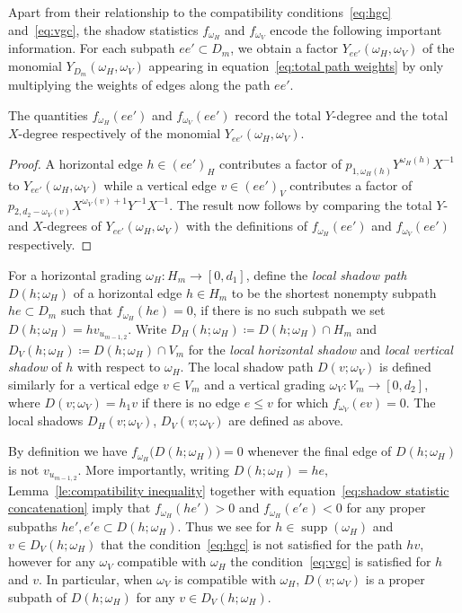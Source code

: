 \documentclass[ALCO,ThmDefs,Unicode,epreuves]{cedram}
\DeclareMathOperator{\supp}{supp}
\begin{document}
Apart from their relationship to the compatibility conditions~\eqref{eq:hgc} and~\eqref{eq:vgc}, the shadow statistics $f_{\omega_H}$ and $f_{\omega_V}$ encode the following important information. 
For each subpath $ee'\subset D_m$, we obtain a factor $Y_{ee'}(\omega_H,\omega_V)$ of the monomial $Y_{D_m}(\omega_H,\omega_V)$ appearing in equation~\eqref{eq:total path weights} by only multiplying the weights of edges along the path $ee'$.
\begin{lemma}
 \label{le:shadows and degrees}
 The quantities $f_{\omega_H}(ee')$ and $f_{\omega_V}(ee')$ record the total $Y$-degree and the total $X$-degree respectively of the monomial $Y_{ee'}(\omega_H,\omega_V)$.
\end{lemma}

\begin{proof}
 A horizontal edge $h \in ( e e ' )_{ H}$ contributes a factor of $p _{ 1 , \omega_{ H}  ( h )}  Y^{ \omega_{ H}  ( h ) }X^{ - 1}$  to $Y_{ e e '} ( \omega_{ H} , \omega_{ V} )$ while a vertical edge $v\in(ee')_V$ contributes a factor of\break $p_{2,d_2-\omega_V(v)}X^{\omega_V(v)+1}Y^{-1}X^{-1}$. 
 The result now follows by comparing the total $Y$- and $X$-degrees of $Y_{ee'}(\omega_H,\omega_V)$ with the definitions of $f_{\omega_H}(ee')$ and $f_{\omega_V}(ee')$ respectively.
\end{proof}

For a horizontal grading $\omega_H:H_m\to[0,d_1]$, define the \emph{local shadow path} $D(h;\omega_H)$ of a horizontal edge $h\in H_m$ to be the shortest nonempty subpath $he\subset D_m$ such that $f_{\omega_H}(he)=0$, if there is no such subpath we set $D(h;\omega_H)=hv_{u_{m-1,2}}$. 
Write $D_H(h;\omega_H)\coloneqq D(h;\omega_H)\cap H_m$ and $D_V(h;\omega_H)\coloneqq D(h;\omega_H)\cap V_m$ for the \emph{local horizontal shadow} and \emph{local vertical shadow} of $h$ with respect to $\omega_H$. 
The local shadow path $D(v;\omega_V)$ is defined similarly for a vertical edge $v\in V_m$ and a vertical grading $\omega_V:V_m\to[0,d_2]$, where $D(v;\omega_V)=h_1v$ if there is no edge $e\le v$ for which $f_{\omega_V}(ev)=0$.
The local shadows $D_H(v;\omega_V)$, $D_V(v;\omega_V)$ are defined as above. 

By definition we have $f_{\omega_H}\big(D(h;\omega_H)\big)=0$ whenever the final edge of $D(h;\omega_H)$ is not $v_{u_{m-1,2}}$. 
More importantly, writing $D(h;\omega_H)=he$, Lemma~\ref{le:compatibility inequality} together with equation~\eqref{eq:shadow statistic concatenation} imply that $f_{\omega_H}(he')>0$ and $f_{\omega_H}(e'e)<0$ for any proper subpaths $he',e'e\subset D(h;\omega_H)$. 
Thus we see for $h\in\supp(\omega_H)$ and $v\in D_V(h;\omega_H)$ that the condition~\eqref{eq:hgc} is not satisfied for the path $hv$, however for any $\omega_V$ compatible with $\omega_H$ the condition~\eqref{eq:vgc} is satisfied for $h$ and $v$. 
In particular, when $\omega_V$ is compatible with $\omega_H$, $D(v;\omega_V)$ is a proper subpath of $D(h;\omega_H)$ for any $v\in D_V(h;\omega_H)$.
\end{document}
